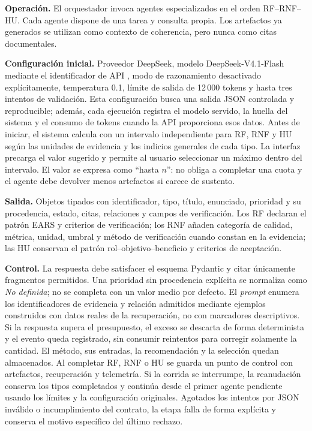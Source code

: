 \textbf{Operación.} El orquestador invoca agentes especializados en el orden RF--RNF--HU. Cada agente dispone de una tarea y consulta propia. Los artefactos ya generados se utilizan como contexto de coherencia, pero nunca como citas documentales.

\textbf{Configuración inicial.} Proveedor DeepSeek, modelo DeepSeek-V4.1-Flash mediante el identificador de API , modo de razonamiento desactivado explícitamente, temperatura 0.1, límite de salida de 12\,000 tokens y hasta tres intentos de validación. Esta configuración busca una salida JSON controlada y reproducible; además, cada ejecución registra el modelo servido, la huella del sistema y el consumo de tokens cuando la API proporciona esos datos. Antes de iniciar, el sistema calcula con  un intervalo independiente para RF, RNF y HU según las unidades de evidencia y los indicios generales de cada tipo. La interfaz precarga el valor sugerido y permite al usuario seleccionar un máximo dentro del intervalo. El valor se expresa como ``hasta \(n\)'': no obliga a completar una cuota y el agente debe devolver menos artefactos si carece de sustento.

\textbf{Salida.} Objetos tipados con identificador, tipo, título, enunciado, prioridad y su procedencia, estado, citas, relaciones y campos de verificación. Los RF declaran el patrón EARS y criterios de verificación; los RNF añaden categoría de calidad, métrica, unidad, umbral y método de verificación cuando constan en la evidencia; las HU conservan el patrón rol--objetivo--beneficio y criterios de aceptación.

\textbf{Control.} La respuesta debe satisfacer el esquema Pydantic y citar únicamente fragmentos permitidos. Una prioridad sin procedencia explícita se normaliza como \emph{No definida}; no se completa con un valor medio por defecto. El \emph{prompt} enumera los identificadores de evidencia y relación admitidos mediante ejemplos construidos con datos reales de la recuperación, no con marcadores descriptivos. Si la respuesta supera el presupuesto, el exceso se descarta de forma determinista y el evento queda registrado, sin consumir reintentos para corregir solamente la cantidad. El método, sus entradas, la recomendación y la selección quedan almacenados. Al completar RF, RNF o HU se guarda un punto de control con artefactos, recuperación y telemetría. Si la corrida se interrumpe, la reanudación conserva los tipos completados y continúa desde el primer agente pendiente usando los límites y la configuración originales. Agotados los intentos por JSON inválido o incumplimiento del contrato, la etapa falla de forma explícita y conserva el motivo específico del último rechazo.

